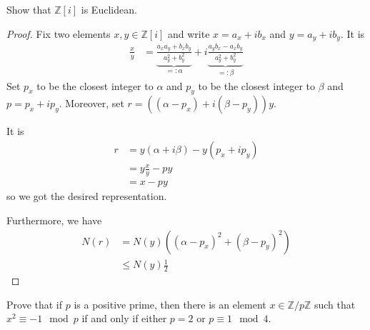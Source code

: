 \begin{example}
    Show that \(\mathbb{Z}[i]\) is Euclidean.
\end{example}
\begin{proof}
    Fix two elements \(x, y \in \mathbb{Z}[i]\) and write \(x = a_x + i b_x\) and \(y = a_y + i b_y\). It is
    \begin{align*}
        \frac{x}{y} &= \underbrace{\frac{a_x a_y + b_x b_y}{a_y^2 + b_y^2}}_{=: \alpha} + i \underbrace{\frac{a_y b_x - a_x b_y}{a_y^2 + b_y^2}}_{=: \beta}
    \end{align*}
    Set \(p_x\) to be the closest integer to \(\alpha\) and \(p_y\) to be the closest integer to \(\beta\) and \(p = p_x + i p_y\). Moreover, set \(r = ((\alpha - p_x) + i (\beta - p_y)) y\).

    It is
    \begin{align*}
        r &= y(\alpha + i \beta) - y (p_x + i p_y) \\
        &= y \frac{x}{y} - py \\
        &= x - py
    \end{align*}
    so we got the desired representation.

    Furthermore, we have
    \begin{align*}
        N(r) &= N(y) ((\alpha - p_x)^2 + (\beta - p_y)^2)\\
        &\leq N(y) \frac{1}{2}
    \end{align*}
\end{proof}
\begin{example}
    Prove that if \(p\) is a positive prime, then there is an element \(x \in \mathbb{Z}/p\mathbb{Z}\) such that \(x^2 \equiv -1 \mod{p}\) if and only if either \(p = 2\) or \(p \equiv 1 \mod{4}\).
\end{example}

